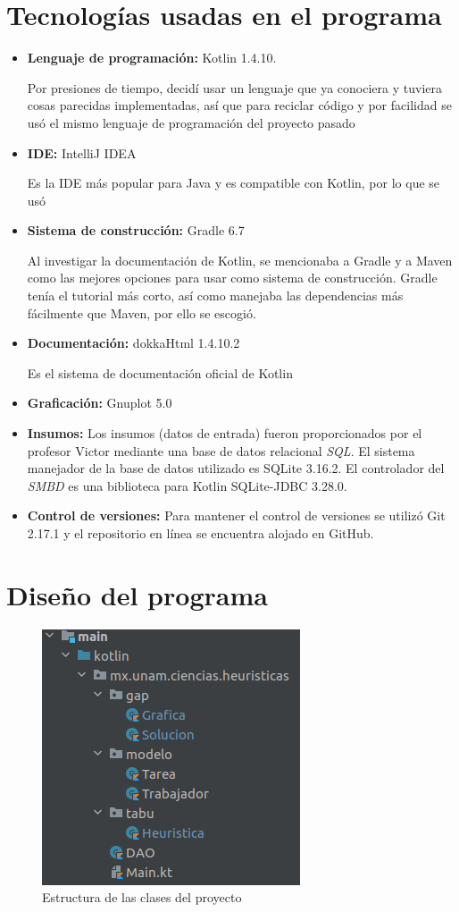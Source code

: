 \documentclass{article}
\begin{document}
\section{Tecnologías usadas en el programa}
\begin{itemize}
	\item{ \textbf{Lenguaje de programación:} Kotlin 1.4.10. 
		
	Por presiones de tiempo, decidí usar un lenguaje que ya conociera y tuviera cosas parecidas implementadas, así que para reciclar código y por facilidad se usó el mismo lenguaje de programación del proyecto pasado}
	\item {\textbf{IDE:} IntelliJ IDEA
		
	Es la IDE más popular para Java y es compatible con Kotlin, por lo que se usó}
	\item {\textbf{Sistema de construcción:} Gradle 6.7
		
	Al investigar la documentación de Kotlin, se mencionaba a Gradle y a Maven como las mejores opciones para usar como sistema de construcción. Gradle tenía el tutorial más corto, así como manejaba las dependencias más fácilmente que Maven, por ello se escogió.
	}
	\item {\textbf{Documentación:} dokkaHtml 1.4.10.2  
	
	Es el sistema de documentación oficial de Kotlin}
	\item {\textbf{Graficación:} Gnuplot 5.0}
	\item {\textbf{Insumos:} Los insumos (datos de entrada) fueron proporcionados por el profesor Victor mediante una base de datos relacional \textit{SQL}. El sistema manejador de la base de datos utilizado es SQLite 3.16.2. El controlador del \textit{SMBD} es una biblioteca para Kotlin SQLite-JDBC 3.28.0.}
	\item {\textbf{Control de versiones:} Para mantener el control de versiones se utilizó Git 2.17.1 y el repositorio en línea se encuentra alojado en GitHub.}
\end{itemize}

\section{Diseño del programa}

\begin{figure}[H]
	\centering
	\includegraphics[scale=0.8]{imgs/estructura.png}
	\caption{Estructura de las clases del proyecto}
\end{figure}
\end{document}
